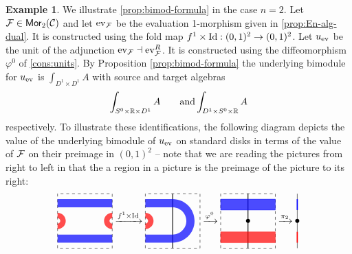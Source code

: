 \documentclass[10pt, reqno, twoside
, final
]{amsart}
\numberwithin{equation}{subsection}%
\theoremstyle{definition}
\theoremstyle{definition}
\theoremstyle{definition}
\theoremstyle{definition}
\theoremstyle{definition}
\theoremstyle{definition}
\theoremstyle{definition}
\theoremstyle{definition}
\theoremstyle{definition}
\theoremstyle{plain}
\theoremstyle{definition}
\theoremstyle{plain}
\theoremstyle{definition}
\theoremstyle{plain}
\theoremstyle{definition}
\theoremstyle{definition}
\theoremstyle{plain}
\theoremstyle{plain}
\theoremstyle{definition}
\newtheorem{ex}[defn]{Example}
\theoremstyle{plain}
\theoremstyle{plain}
\theoremstyle{plain}
\begin{document}
\begin{ex}
We illustrate \cref{prop:bimod-formula} in the case $n=2$. Let $\mathcal{F} \in \mathsf{Mor}_2(\mathcal{C})$ and let $\mathrm{ev}_{\mathcal{F}}$ be the evaluation 1-morphism given in \cref{prop:En-alg-dual}. It is constructed using the fold map $f^1 \times \text{Id}:(0,1)^2 \to (0,1)^2$. Let $u_{\mathrm{ev}}$ be the unit of the adjunction $\mathrm{ev}_{\mathcal{F}}\dashv \mathrm{ev}_{\mathcal{F}}^R$. It is constructed using the diffeomorphism $\varphi^0$ of \cref{cons:units}. By Proposition \ref{prop:bimod-formula} the underlying bimodule for $u_{\mathrm{ev}}$ is $\int_{D^{1} \times D^{1}} A $ with source and target algebras
\begin{equation*}
    \int_{S^0 \times \mathbb{R} \times D^1}A \qquad \text{and} \int_{D^1 \times S^0 \times \mathbb{R}}A 
\end{equation*}
respectively. To illustrate these identifications, the following diagram depicts the value of the underlying bimodule of $u_{\mathrm{ev}}$ on standard disks in terms of the value of $\mathcal{F}$ on their preimage in $(0,1)^2$ -- note that we are reading the pictures from right to left in that the a region in a picture is the preimage of the picture to its right:
\begin{equation*}
  \begin{tikzpicture}[baseline=0.9cm]
    \draw[dashed] (0,0) rectangle (2,2);
    \fill[blue,opacity=0.7] (0,0.2) rectangle (2,0.5);
    \fill[blue,opacity=0.7] (0,1.5) rectangle (2,1.8);
     \fill[red,opacity=0.7] (0,0.7) arc[start angle = -90, end angle = 90,radius = 0.3]  
    -- (0,1.1)  arc[start angle = 90, end angle = -90,radius = 0.1]  -- (0,0.7) ;
     \fill[red,opacity=0.7] (2,0.7) arc[start angle = 270, end angle = 90,radius = 0.3]  
    -- (2,1.1)  arc[start angle = 90, end angle = 270,radius = 0.1]  -- (2,0.7) ;
\end{tikzpicture}
\xrightarrow{f^1 \times \Id}
\begin{tikzpicture}[baseline=0.9cm]
    \draw[dashed] (0,0) rectangle (2,2);
    \draw[thick] (1,2) -- (1,0);
    \fill[blue,opacity=0.7] (0,0.2) -- (1,0.2) arc[start angle = -90, end angle = 90,radius = 0.8]  
    -- (0,1.8) -- (0,1.5) -- (1,1.5) arc[start angle = 90, end angle = -90,radius = 0.5] 
    -- (0,0.5) -- (0,0.2);
    \fill[red,opacity=0.7] (0,0.7) arc[start angle = -90, end angle = 90,radius = 0.3]  
    -- (0,1.1)  arc[start angle = 90, end angle = -90,radius = 0.1]  -- (0,0.7) ;
\end{tikzpicture}
\xrightarrow{\varphi^0}
\begin{tikzpicture}[baseline=0.9cm]
    \draw[dashed] (0,0) rectangle (2,2);
    \draw[thick] (1,2) -- (1,0);
    \node[fill,circle,inner sep=1.5pt] at (1,1) {};
    \filldraw[red,opacity=0.7] (0,0.2) rectangle (2,0.6);
    \filldraw[blue,opacity=0.7] (0,1.4) rectangle (2,1.8);
\end{tikzpicture}
\xrightarrow{\pi_2}
\begin{tikzpicture}[baseline=0.9cm]
    \draw (1,2) -- (1,0);
    \node[fill,circle,inner sep=1.5pt] at (1,1) {};
    \draw[red,very thick] (1,0.2) -- (1,0.6);
    \draw[blue,very thick] (1,1.4) -- (1,1.8);
\end{tikzpicture}
\end{equation*}


\end{ex}
\end{document}
